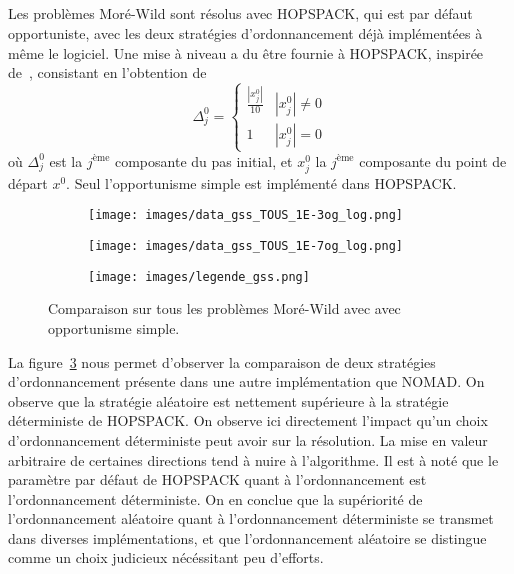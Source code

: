 \subsection{\GSS}\label{sec:cgs} 
Les problèmes Moré-Wild sont résolus avec HOPSPACK, qui est par défaut opportuniste, avec les deux stratégies d'ordonnancement déjà implémentées à même le logiciel. Une mise à niveau a du être fournie à HOPSPACK, inspirée de~\cite{AuLedTr2014}, consistant en l'obtention de
	\[\Delta^0_j =  \begin{cases} 
	\frac{|x^0_j|}{10} & |x^0_j| \neq 0 \\
	1 & |x^0_j| = 0
	\end{cases}
	\]
où $\Delta_j^0$ est la $j^{\text{ème}}$ composante du pas initial, et $x^0_j$ la $j^{\text{ème}}$ composante du point de départ $x^0$. Seul l'opportunisme simple est implémenté dans HOPSPACK.
\begin{figure}[!htb]
	\centering
	\begin{subfigure}{0.43\textwidth}
		\texttt{[image: images/data\_gss\_TOUS\_1E-3og\_log.png]}
		\label{fig:data_gss_TOUS_1E-3og_log}
	\end{subfigure}%
	\begin{subfigure}{0.43\textwidth}
		\texttt{[image: images/data\_gss\_TOUS\_1E-7og\_log.png]}
		\label{fig:data_gss_TOUS_1E-7og_log}
	\end{subfigure}
	\smallskip
	\begin{subfigure}{0.95\textwidth}
		\texttt{[image: images/legende\_gss.png]}
	\end{subfigure}
	\caption{Comparaison sur tous les problèmes Moré-Wild avec \GSS avec opportunisme simple.}
	\label{fig:legende_gss}
\end{figure}
La figure~\ref{fig:legende_gss} nous permet d'observer la comparaison de deux stratégies d'ordonnancement présente dans une autre implémentation que NOMAD. On observe que la stratégie aléatoire est nettement supérieure à la stratégie déterministe de HOPSPACK. On observe ici directement l'impact qu'un choix d'ordonnancement déterministe peut avoir sur la résolution. La mise en valeur arbitraire de certaines directions tend à nuire à l'algorithme. Il est à noté que le paramètre par défaut de HOPSPACK quant à l'ordonnancement est l'ordonnancement déterministe. On en conclue que la supériorité de l'ordonnancement aléatoire quant à l'ordonnancement déterministe se transmet dans diverses implémentations, et que l'ordonnancement aléatoire se distingue comme un choix judicieux nécéssitant peu d'efforts.
